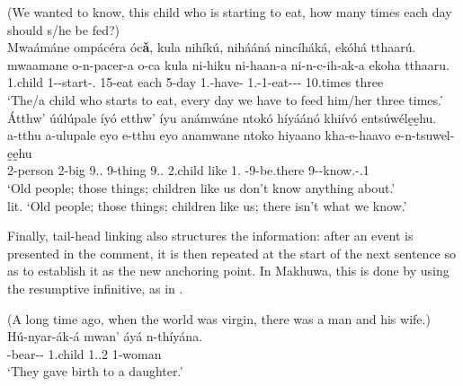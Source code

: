 \documentclass[output=paper]{langscibook}
\begin{document}
\ex
\label{bkm:Ref109900589}
(We wanted to know, this child who is starting to eat, how many times each day should s/he be fed?)\\
Mwaámáne ompácéra óc\textbf{ǎ}, kula nihíkú, nihááná nincíháká, ekóhá tthaarú.\\
\gll
mwaamane  o-n-pacer-a  o-ca  kula  ni-hiku  ni-haan-a  ni-n-c-ih-ak-a  ekoha  tthaaru.\\
1.child  1-\PRS{}-start-\FV{}.\REL{}  15-eat  each  5-day  1\PL{}.\SM{}-have-\FV{}  1\PL{}.\SM{}-1\OM{}-eat-\CAUS{}-\DUR{}-\FV{}  10.times  three\\
\glt
‘The/a child who starts to eat, every day we have to feed him/her three times.’\\
\pagebreak
\ex
\label{bkm:Ref96973205}
Átthw’ úúlúpale íyó etthw’ íyu anámwáne ntokó híyáánó khiívó entsúwélḛḛhu.\\
\gll
a-tthu  a-ulupale  eyo  e-tthu  eyo  anamwane  ntoko  hiyaano   kha-e-haavo  e-n-tsuwel-ḛḛhu \\
2-person  2-big  9.\DEM{}.\MED{}  9-thing  9.\DEM{}.\MED{}  2.child  like  1\PL{}.\PRO{}  \NEG{}-9\SM{}-be.there  9{}-\PRS{}-know.\REL{}-\POSS{}.1\PL{} \\
\glt
‘Old people; those things; children like us don’t know anything about.’\\
lit. ‘Old people; those things; children like us; there isn’t what we know.’\\

\z

Finally, tail-head linking also structures the information: after an event is presented in the comment, it is then repeated at the start of the next sentence so as to establish it as the new anchoring point. In Makhuwa, this is done by using the resumptive infinitive, as in .

\ea
\label{bkm:Ref117580122}
(A long time ago, when the world was virgin, there was a man and his wife.)\\
\gll
Hú-nyar-ák-á  mwan’  áyá  n-thíyána.\\
\NARR{}-bear-\DUR{}-\FV{}  1.child  1.\POSS{}.2  1-woman\\
\glt
‘They gave birth to a daughter.’\\
\end{document}

